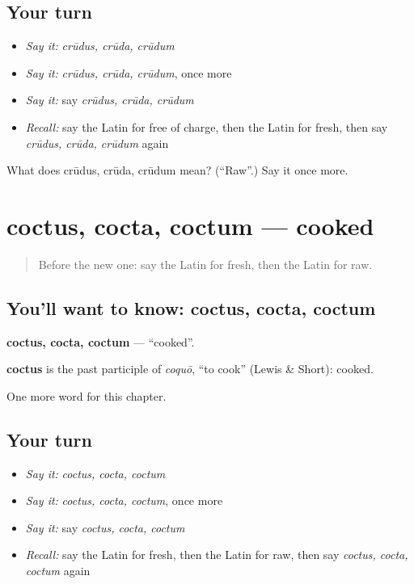 \subsection*{Your turn}
\begin{itemize}
\raggedright
  \item \emph{Say it:} \emph{crūdus, crūda, crūdum}
  \item \emph{Say it:} \emph{crūdus, crūda, crūdum}, once more
  \item \emph{Say it:} say \emph{crūdus, crūda, crūdum}
  \item \emph{Recall:} say the Latin for free of charge, then the Latin for fresh, then say \emph{crūdus, crūda, crūdum} again
\end{itemize}

\begin{tcolorbox}[breakable,colback=teal!4,colframe=teal!35!black,title={Before you move on}]
What does crūdus, crūda, crūdum mean? (\textquotedblleft{}Raw\textquotedblright{}.) Say it once more.
\end{tcolorbox}
\section[coctus, cocta, coctum]{coctus, cocta, coctum — cooked}

\label{lesson:LA-C181-coctus}



\begin{quote}
Before the new one: say the Latin for fresh, then the Latin for raw.
\end{quote}

\subsection*{You'll want to know: coctus, cocta, coctum}
\textbf{coctus, cocta, coctum} — \textquotedblleft{}cooked\textquotedblright{}.

\begin{cousinweb}
\textbf{coctus} is the past participle of \emph{coquō}, \textquotedblleft{}to cook\textquotedblright{} (Lewis \& Short): cooked.
\end{cousinweb}

\begin{grammarlens}[title={What you've built}]
One more word for this chapter.
\end{grammarlens}

\subsection*{Your turn}
\begin{itemize}
\raggedright
  \item \emph{Say it:} \emph{coctus, cocta, coctum}
  \item \emph{Say it:} \emph{coctus, cocta, coctum}, once more
  \item \emph{Say it:} say \emph{coctus, cocta, coctum}
  \item \emph{Recall:} say the Latin for fresh, then the Latin for raw, then say \emph{coctus, cocta, coctum} again
\end{itemize}


